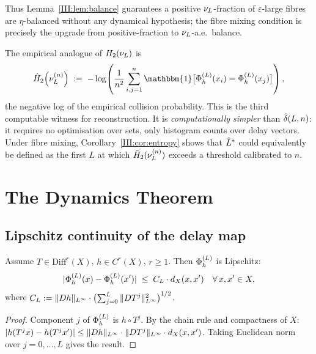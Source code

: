 Thus Lemma~\ref{III:lem:balance} guarantees a positive $\nu_L$-fraction of
$\varepsilon$-large fibres are $\eta$-balanced without any dynamical hypothesis;
the fibre mixing condition is precisely the upgrade from positive-fraction to
$\nu_L$-a.e.\ balance.

\begin{remark}
\label{III:rem:entropy-witness}
The empirical analogue of $H_2(\nu_L)$ is
\[
  \hat{H}_2\!\left(\nuL^{(n)}\right)
  \;:=\;
  -\log\!\left(\frac{1}{n^2}\sum_{i,j=1}^n
    \mathbbm{1}\bigl[\PhiL(x_i) = \PhiL(x_j)\bigr]\right),
\]
the negative log of the empirical collision probability.
This is the third computable witness for reconstruction.
It is \emph{computationally simpler} than $\hat{\delta}(L,n)$: it requires no
optimisation over sets, only histogram counts over delay vectors.
Under fibre mixing, Corollary~\ref{III:cor:entropy} shows that $\hat{L}^*$ could
equivalently be defined as the first $L$ at which $\hat{H}_2(\nu_L^{(n)})$
exceeds a threshold calibrated to $n$.
\end{remark}

\section{The Dynamics Theorem}
\label{III:sec:dynamics}

\subsection{Lipschitz continuity of the delay map}

\begin{lemma}
\label{III:lem:upper-lip}
Assume $T \in \mathrm{Diff}^r(X)$, $h \in C^r(X)$, $r \geq 1$.
Then $\Phi_h^{(L)}$ is Lipschitz:
\[
  |\Phi_h^{(L)}(x) - \Phi_h^{(L)}(x')| \;\leq\; C_L \cdot d_X(x,x')
  \quad\forall\, x, x' \in X,
\]
where $C_L := \|Dh\|_{L^{\infty}} \cdot \bigl(\sum_{j=0}^{L}
\|DT^j\|_{L^{\infty}}^2\bigr)^{1/2}$.
\end{lemma}

\begin{proof}
Component $j$ of $\Phi_h^{(L)}$ is $h \circ T^j$.
By the chain rule and compactness of $X$:
$|h(T^j x) - h(T^j x')| \leq \|Dh\|_{L^{\infty}} \cdot \|DT^j\|_{L^{\infty}} \cdot d_X(x,x')$.
Taking Euclidean norm over $j = 0, \ldots, L$ gives the result.
\end{proof}

